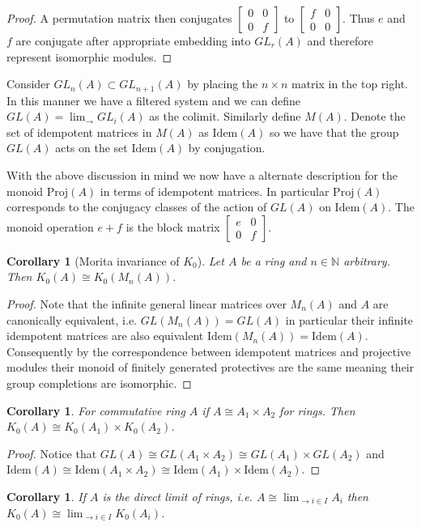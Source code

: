 \documentclass[12pt]{report}
\numberwithin{equation}{section}
\newcommand{\N}{\mathbb{N}}
\newcounter{dummy} \numberwithin{dummy}{section}
\newtheorem{corollary}[dummy]{Corollary}
\begin{document}
\begin{proof}
		A permutation matrix then conjugates $\begin{bmatrix} 0 & 0 \\ 0 & f \end{bmatrix}$ to $\begin{bmatrix} f & 0 \\ 0 & 0 \end{bmatrix}$. Thus $e$ and $f$ are conjugate after appropriate embedding into $GL_r(A)$ and therefore represent isomorphic modules.
	\end{proof}
	
	Consider $GL_n(A) \subset GL_{n+1}(A)$ by placing the $n\times n $ matrix in the top right. In this manner we have a filtered system and we can define $GL(A)= \lim_{\to} GL_i(A)$ as the colimit. Similarly define $M(A)$. Denote the set of idempotent matrices in $M(A)$ as $\mathrm{Idem}(A)$ so we have that the group $GL(A)$ acts on the set $\mathrm{Idem}(A)$ by conjugation.
	
	With the above discussion in mind we now have a alternate description for the monoid $\mathrm{Proj}(A)$ in terms of idempotent matrices. In particular $\mathrm{Proj}(A)$ corresponds to the conjugacy classes of the action of $GL(A)$ on $\mathrm{Idem}(A)$. The monoid operation $e +f$ is the block matrix $\begin{bmatrix}
		e & 0 \\ 0 & f
	\end{bmatrix}. $
	
	\begin{corollary}[Morita invariance of $K_0$]\label{morita}
		Let $A$ be a ring and $n \in \N $ arbitrary. Then $K_0(A) \cong K_0(M_n(A))$.
	\end{corollary}
	\begin{proof}
		Note that the infinite general linear matrices over $M_n(A) $ and $A$ are canonically equivalent, i.e. $GL(M_n(A)) = GL(A)$ in particular their infinite idempotent matrices are also equivalent $\mathrm{Idem}(M_n(A)) = \mathrm{Idem}(A)$. Consequently by the correspondence between idempotent matrices and projective modules their monoid of finitely generated protectives are the same meaning their group completions are isomorphic.
	\end{proof}
	
	\begin{corollary}\label{propdirectproductofk0}
		For commutative ring $A$ if $A \cong A_1 \times A_2$ for rings. Then	$K_0(A) \cong K_0(A_1) \times K_0(A_2)$.
	\end{corollary}
	\begin{proof}
	Notice that $GL(A) \cong GL(A_1 \times A_2) \cong GL(A_1) \times GL(A_2)$ and $\mathrm{Idem}(A) \cong \mathrm{Idem}(A_1 \times A_2) \cong \mathrm{Idem}(A_1) \times \mathrm{Idem}(A_2)$.
	\end{proof}
	\begin{corollary}\label{directsystem}
		If $A$ is the direct limit of rings, i.e. $A\cong \lim_{\to i \in I} A_i $ then $K_0(A) \cong \lim_{\to i \in I} K_0(A_i)$.
	\end{corollary}
	
\end{document}
